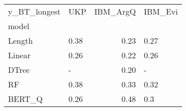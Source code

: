 \begin{tabular}{llrl}
\toprule
y\_BT\_longest &   UKP &  IBM\_ArgQ & IBM\_Evi \\
model  &       &           &         \\
\midrule
Length &  0.38 &      0.23 &    0.27 \\
Linear &  0.26 &      0.22 &    0.26 \\
DTree  &     - &      0.20 &       - \\
RF     &  0.38 &      0.33 &    0.32 \\
BERT\_Q &  0.26 &      0.48 &     0.3 \\
\bottomrule
\end{tabular}
